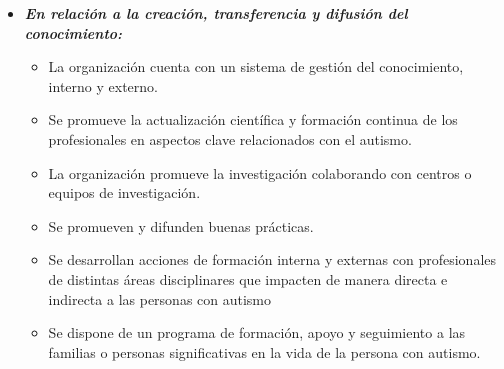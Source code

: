 \begin{itemize}
\begin{itemize}
		
		\item \textbf{\textit{En relación a la creación, transferencia y difusión del conocimiento:}}
		\begin{itemize}
			\item La organización cuenta con un sistema de gestión del conocimiento, interno y externo. 
			\item Se promueve la actualización científica y formación continua de los profesionales en aspectos clave relacionados con el autismo. 
			\item La organización promueve la investigación colaborando con centros o equipos de investigación.  
			\item Se promueven y difunden buenas prácticas. 
			\item Se desarrollan acciones de formación interna y externas con profesionales de distintas áreas disciplinares que impacten de manera directa e indirecta a las personas con autismo  
			\item Se dispone de un programa de formación, apoyo y seguimiento a las familias o personas significativas en la vida de la persona con autismo. 
		\end{itemize}


\end{itemize}
\end{itemize}
